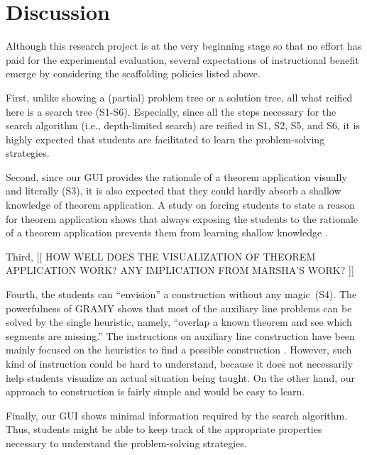 
\section{Discussion}
\label{sec:discussion}

Although this research project is at the very beginning stage so that no
effort has paid for the experimental evaluation, several expectations of
instructional benefit emerge by considering the scaffolding policies
listed above.

First, unlike showing a (partial) problem tree or a solution tree, all
what reified here is a search tree (S1-S6).  Especially, since all the
steps necessary for the search algorithm (i.e., depth-limited search)
are reified in S1, S2, S5, and S6, it is highly expected that students
are facilitated to learn the problem-solving strategies.

Second, since our GUI provides the rationale of a theorem application
visually and literally (S3), it is also expected that they could hardly
absorb a shallow knowledge of theorem application.  A study on forcing
students to state a reason for theorem application shows that always
exposing the students to the rationale of a theorem application prevents
them from learning shallow knowledge \cite{Aleven98}.

Third, [[ HOW WELL DOES THE VISUALIZATION OF THEOREM APPLICATION WORK?
ANY IMPLICATION FROM MARSHA'S WORK? ]] \cite{Lovett94}

Fourth, the students can ``envision'' a construction without any
magic~(S4).  The powerfulness of GRAMY shows that most of the auxiliary
line problems can be solved by the single heuristic, namely, ``overlap a
known theorem and see which segments are missing.''  The instructions on
auxiliary line construction have been mainly focused on the heuristics
to find a possible construction \cite{Polya57}.  However, such kind of
instruction could be hard to understand, because it does not necessarily
help students visualize an actual situation being taught.  On the other
hand, our approach to construction is fairly simple and would be easy to
learn.

Finally, our GUI shows minimal information required by the search
algorithm.  Thus, students might be able to keep track of the
appropriate properties necessary to understand the problem-solving
strategies.  

